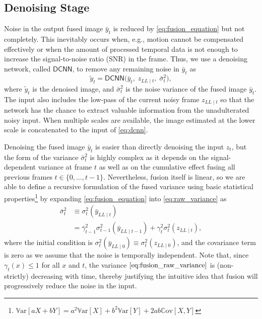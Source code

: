 \documentclass[final]{cvpr}
\newcommand{\LL}{\scriptscriptstyle{LL\mid}}
\newcommand{\comma}{,\;}
\begin{document}
    
    \subsection{Denoising Stage}
    
    Noise in the output fused image $\bar{y}_t$ is reduced by \eqref{eq:fusion_equation} but not completely. This inevitably occurs when, e.g., motion cannot be compensated effectively or when the amount of processed temporal data is not enough to increase the signal-to-noise ratio (SNR) in the frame. Thus, we use a denoising network, called $\mathsf{DCNN}$, to remove any remaining noise in $\bar{y}_t$ as
    \begin{equation}
        \tilde{y}_t = \mathsf{DCNN}\Big( \bar{y}_t \comma z_{\LL t} \comma \bar{\sigma}^2_t \Big),
        \label{eq:dcnn}
    \end{equation}
    where $\tilde{y}_t$ is the denoised image, and $\bar{\sigma}^2_t$ is the noise variance of the fused image $\bar{y}_t$. The input also includes the low-pass of the current noisy frame $z_{\LL t}$ so that the network has the chance to extract valuable information from the unadulterated noisy input. When multiple scales are available, the image estimated at the lower scale is concatenated to the input of \eqref{eq:dcnn}.
    
    Denoising the fused image $\bar{y}_t$ is easier than directly denoising the input $z_t$, but the form of the variance $\bar{\sigma}^2_t$ is highly complex as it depends on the signal-dependent variance at frame $t$ as well as on the cumulative effect fusing all previous frames $t \in \{0, \ldots, t-1\}$. Nevertheless, fusion itself is linear, so we are able to define a recursive formulation of the fused variance using basic statistical properties\footnote{$\mathbb{V}\text{ar}[aX+bY] = a^2\mathbb{V}\text{ar}[X] + b^2\mathbb{V}\text{ar}[Y] + 2ab\mathbb{C}\text{ov}[X,Y]$} by expanding \eqref{eq:fusion_equation} into \eqref{eq:raw_variance} as
    \begin{align}
        \bar{\sigma}^2_t &\equiv \sigma^2_t\left(\bar{y}_{\LL t}\right) \nonumber \\
        &= \bar{\gamma}^2_{t-1} \sigma^2_{t-1}\left(\bar{y}_{\LL t-1}\right) + \gamma^2_t \sigma^2_t\left(z_{\LL t}\right),
        \label{eq:fusion_raw_variance}
    \end{align}
    where the initial condition is $\sigma^2_t\left(\bar{y}_{\LL 0}\right) \equiv \sigma^2_t\left(z_{\LL 0}\right)$, and the covariance term is zero as we assume that the noise is temporally independent. Note that, since $\gamma_t(x) \leq 1$ for all $x$ and $t$, the variance $\eqref{eq:fusion_raw_variance}$ is (non-strictly) decreasing with time, thereby justifying the intuitive idea that fusion will progressively reduce the noise in the input.
    
\end{document}
